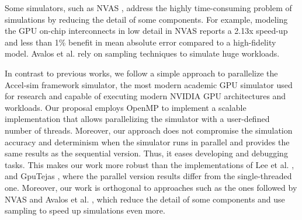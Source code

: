 \par
Some simulators, such as NVAS \cite{nvas}, address the highly time-consuming problem of simulations by reducing the detail of some components. For example, modeling the GPU on-chip interconnects in low detail in NVAS reports a 2.13x speed-up and less than 1\% benefit in mean absolute error compared to a high-fidelity model. Avalos et al. \cite{pcaKernelGpuSampling} rely on sampling techniques to simulate huge workloads.

\par
In contrast to previous works, we follow a simple approach to parallelize the Accel-sim framework simulator, the most modern academic GPU simulator used for research and capable of executing modern NVIDIA GPU architectures and workloads. Our proposal employs OpenMP \cite{openmp} to implement a scalable implementation that allows parallelizing the simulator with a user-defined number of threads. Moreover, our approach does not compromise the simulation accuracy and determinism when the simulator runs in parallel and provides the same results as the sequential version. Thus, it eases developing and debugging tasks. This makes our work more robust than the implementations of Lee et al. \cite{parallelGPUSim1} \cite{parallelGPUSim2}, and GpuTejas \cite{gputejas}, where the parallel version results differ from the single-threaded one. Moreover, our work is orthogonal to approaches such as the ones followed by NVAS \cite{nvas} and Avalos et al. \cite{pcaKernelGpuSampling}, which reduce the detail of some components and use sampling to speed up simulations even more.

